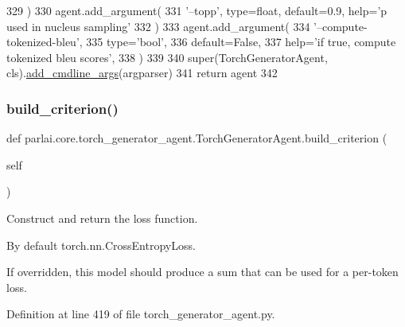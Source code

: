 \begin{DoxyCode}
329         )
330         agent.add\_argument(
331             \textcolor{stringliteral}{'--topp'}, type=float, default=0.9, help=\textcolor{stringliteral}{'p used in nucleus sampling'}
332         )
333         agent.add\_argument(
334             \textcolor{stringliteral}{'--compute-tokenized-bleu'},
335             type=\textcolor{stringliteral}{'bool'},
336             default=\textcolor{keyword}{False},
337             help=\textcolor{stringliteral}{'if true, compute tokenized bleu scores'},
338         )
339 
340         super(TorchGeneratorAgent, cls).\hyperlink{namespaceparlai_1_1agents_1_1drqa_1_1config_a62fdd5554f1da6be0cba185271058320}{add\_cmdline\_args}(argparser)
341         \textcolor{keywordflow}{return} agent
342 
\end{DoxyCode}
\mbox{\label{classparlai_1_1core_1_1torch__generator__agent_1_1TorchGeneratorAgent_a8f8437dd8d0dc44f941dbc6182121284}} 
\subsubsection{\texorpdfstring{build\+\_\+criterion()}{build\_criterion()}}
{\footnotesize\ttfamily def parlai.\+core.\+torch\+\_\+generator\+\_\+agent.\+Torch\+Generator\+Agent.\+build\+\_\+criterion (\begin{DoxyParamCaption}\item[{}]{self }\end{DoxyParamCaption})}

\begin{DoxyVerb}Construct and return the loss function.

By default torch.nn.CrossEntropyLoss.

If overridden, this model should produce a sum that can be used for a per-token loss.
\end{DoxyVerb}
 

Definition at line 419 of file torch\+\_\+generator\+\_\+agent.\+py.


